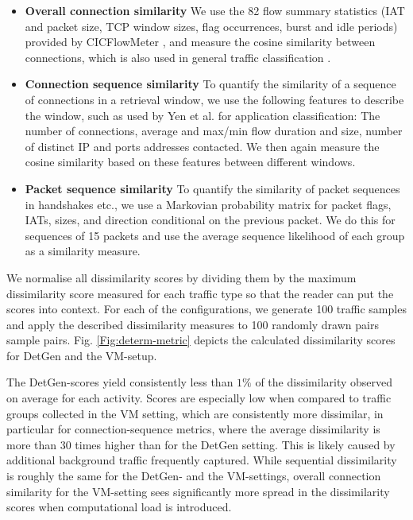 \documentclass[runningheads]{llncs}
\begin{document}
\begin{itemize}
\item \textbf{Overall connection similarity} We use the 82 flow summary statistics (IAT and packet size, TCP window sizes, flag occurrences, burst and idle periods) provided by CICFlowMeter \cite{lashkari2017characterization}, and measure the cosine similarity between connections, which is also used in general traffic classification \cite{aun2017review}.
\item \textbf{Connection sequence similarity} 
To quantify the similarity of a sequence of connections in a retrieval window, we use the following features to describe the window, such as used by Yen et al. \cite{yen2009browser} for application classification: The number of connections, average and max/min flow duration and size, number of distinct IP and ports addresses contacted. We then again measure the cosine similarity based on these features between different windows. 
\item \textbf{Packet sequence similarity} To quantify the similarity of packet sequences in handshakes etc., we use a Markovian probability matrix for packet flags, IATs, sizes, and direction conditional on the previous packet. We do this for sequences of 15 packets and use the average sequence likelihood of each group as a similarity measure. %
\end{itemize}

We normalise all dissimilarity scores by dividing them by the maximum dissimilarity score measured for each traffic type so that the reader can put the scores into context.
For each of the configurations, we generate 100 traffic samples and apply the described dissimilarity measures to 100 randomly drawn pairs sample pairs. Fig. \ref{Fig:determ-metric} depicts the calculated dissimilarity scores for DetGen and the VM-setup.

The DetGen-scores yield consistently less than $1\%$ of the dissimilarity observed on average for each activity. Scores are especially low when compared to traffic groups collected in the VM setting, which are consistently more dissimilar, in particular for connection-sequence metrics, where the average dissimilarity is more than 30 times higher than for the DetGen setting.
This is likely caused by additional background traffic frequently captured. While sequential dissimilarity is roughly the same for the DetGen- and the VM-settings, overall connection similarity for the VM-setting sees significantly more spread in the dissimilarity scores when computational load is introduced.
\end{document}

